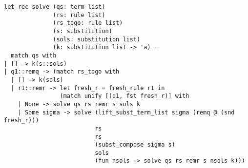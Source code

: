 \documentclass{article}
\begin{document}
\begin{verbatim}
let rec solve (qs: term list)
              (rs: rule list) 
              (rs_togo: rule list) 
              (s: substitution) 
              (sols: substitution list) 
              (k: substitution list -> 'a) =
  match qs with
| [] -> k(s::sols)
| q1::remq -> (match rs_togo with
  | [] -> k(sols)
  | r1::remr -> let fresh_r = fresh_rule r1 in
                (match unify [(q1, fst fresh_r)] with
    | None -> solve qs rs remr s sols k
    | Some sigma -> solve (lift_subst_term_list sigma (remq @ (snd fresh_r)))
                          rs
                          rs 
                          (subst_compose sigma s) 
                          sols 
                          (fun nsols -> solve qs rs remr s nsols k)))
\end{verbatim}
\end{document}
